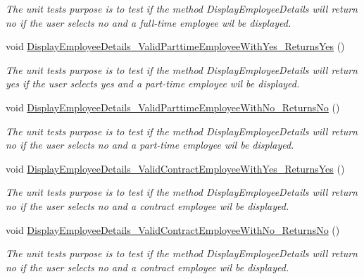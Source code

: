 \begin{DoxyCompactItemize}
\begin{DoxyCompactList}\small\item\em The unit test\textquotesingle{}s purpose is to test if the method Display\+Employee\+Details will return no if the user selects no and a full-\/time employee wil be displayed. \end{DoxyCompactList}\item 
void \hyperlink{class_the_company_1_1_tests_1_1_select_employee_tests_a8e0699759360ee81129c1b3bf5615c67}{Display\+Employee\+Details\+\_\+\+Valid\+Parttime\+Employee\+With\+Yes\+\_\+\+Returns\+Yes} ()
\begin{DoxyCompactList}\small\item\em The unit test\textquotesingle{}s purpose is to test if the method Display\+Employee\+Details will return yes if the user selects yes and a part-\/time employee wil be displayed. \end{DoxyCompactList}\item 
void \hyperlink{class_the_company_1_1_tests_1_1_select_employee_tests_a40ffcb2034d8bd8b6a25017633bbdf4a}{Display\+Employee\+Details\+\_\+\+Valid\+Parttime\+Employee\+With\+No\+\_\+\+Returns\+No} ()
\begin{DoxyCompactList}\small\item\em The unit test\textquotesingle{}s purpose is to test if the method Display\+Employee\+Details will return no if the user selects no and a part-\/time employee wil be displayed. \end{DoxyCompactList}\item 
void \hyperlink{class_the_company_1_1_tests_1_1_select_employee_tests_af47cf169a7796eda40af3d746933cfe2}{Display\+Employee\+Details\+\_\+\+Valid\+Contract\+Employee\+With\+Yes\+\_\+\+Returns\+Yes} ()
\begin{DoxyCompactList}\small\item\em The unit test\textquotesingle{}s purpose is to test if the method Display\+Employee\+Details will return no if the user selects no and a contract employee wil be displayed. \end{DoxyCompactList}\item 
void \hyperlink{class_the_company_1_1_tests_1_1_select_employee_tests_ac008529647e3d484e688123c4f86db80}{Display\+Employee\+Details\+\_\+\+Valid\+Contract\+Employee\+With\+No\+\_\+\+Returns\+No} ()
\begin{DoxyCompactList}\small\item\em The unit test\textquotesingle{}s purpose is to test if the method Display\+Employee\+Details will return no if the user selects no and a contract employee wil be displayed. \end{DoxyCompactList}\item 

\end{DoxyCompactItemize}
